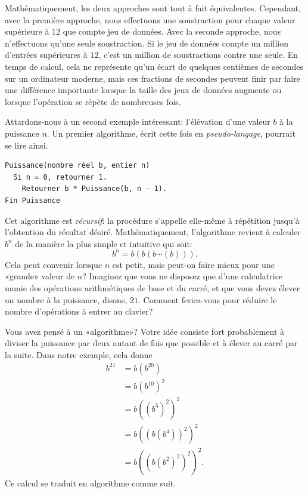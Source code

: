 Mathématiquement, les deux approches sont tout à fait équivalentes.
Cependant, avec la première approche, nous effectuons une soustraction
pour chaque valeur supérieure à $12$ que compte jeu de données. Avec
la seconde approche, nous n'effectuons qu'une seule soustraction. Si
le jeu de données compte un million d'entrées supérieures à $12$,
c'est un million de soustractions contre une seule. En temps de
calcul, cela ne représente qu'un écart de quelques centièmes de
secondes sur un ordinateur moderne, mais ces fractions de secondes
peuvent finir par faire une différence importante lorsque la taille
des jeux de données augmente ou lorsque l'opération se répète de
nombreuses fois.

Attardons-nous à un second exemple intéressant: l'élévation d'une
valeur $b$ à la puissance $n$. Un premier algorithme, écrit cette fois
en \emph{pseudo-langage}, pourrait se lire
ainsi.

\begin{Schunk}
\begin{Verbatim}
Puissance(nombre réel b, entier n)
  Si n = 0, retourner 1.
    Retourner b * Puissance(b, n - 1).
Fin Puissance
\end{Verbatim}
\end{Schunk}

Cet algorithme est \emph{récursif}: la
procédure  s'appelle elle-même à répétition jusqu'à
l'obtention du résultat désiré. Mathématiquement, l'algorithme revient
à calculer $b^n$ de la manière la plus simple et intuitive qui soit:
\begin{equation*}
  b^n = b (b (b \cdots (b))).
\end{equation*}
Cela peut convenir lorsque $n$ est petit, mais peut-on faire mieux
pour une «grande» valeur de $n$? Imaginez que vous ne disposez que
d'une calculatrice munie des opérations arithmétiques de base et du
carré, et que vous devez élever un nombre à la puissance, disons,
$21$. Comment feriez-vous pour réduire le nombre d'opérations à entrer
au clavier?


Vous avez pensé à un «algorithme»? Votre idée consiste fort
probablement à diviser la puissance par deux autant de fois que
possible et à élever au carré par la suite. Dans notre exemple, cela
donne
\begin{align*}
  b^{21}
  &= b (b^{20}) \\
  & = b (b^{10})^2 \\
  &= b ((b^5)^2)^2 \\
  & = b ((b (b^4))^2)^2 \\
  &= b ((b (b^2)^2)^2)^2.
\end{align*}
Ce calcul se traduit en algorithme comme suit.

